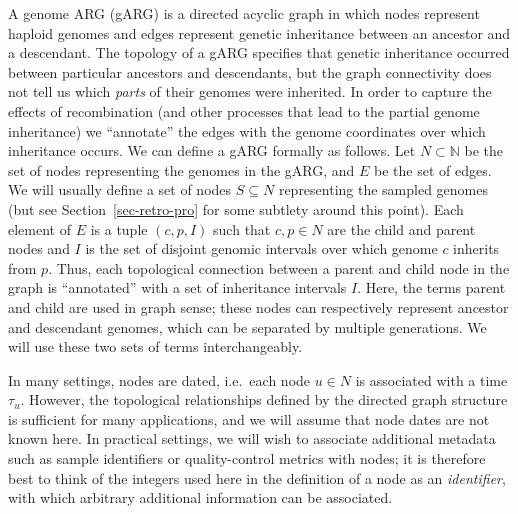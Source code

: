 \documentclass{article}
\begin{document}
A genome ARG (gARG) is a directed acyclic graph in which nodes represent
haploid genomes and edges represent
genetic inheritance between an ancestor and a descendant.
The topology of a gARG specifies that genetic inheritance
occurred between particular
ancestors and descendants, but the graph connectivity
does not tell us which \emph{parts} of their genomes were inherited.
In order to capture the effects of recombination
(and other processes that lead to the partial genome inheritance)
 we ``annotate'' the edges with the genome
coordinates over which inheritance occurs.
We can define a gARG formally as follows.
Let $N \subset \mathbb{N}$ be the set of nodes representing
the genomes in the gARG, and $E$ be the set of edges.
We will usually define a set of nodes $S \subseteq N$
representing the sampled genomes
(but see Section~\ref{sec-retro-pro} for some subtlety around this point).
Each element of $E$ is a tuple $(c, p, I)$ such that $c, p \in N$ are the child and
parent nodes and $I$ is the set of disjoint genomic intervals
over which genome $c$ inherits from $p$.
Thus, each topological connection between
a parent and child node in the graph is ``annotated'' with a set of
inheritance intervals $I$.
Here, the terms parent and child are used in graph sense;
these nodes can respectively represent ancestor and descendant genomes,
which can be separated by multiple generations.
We will use these two sets of terms interchangeably.

In many settings, nodes are dated, i.e.\
each node $u\in N$ is associated with a time $\tau_u$.
However, the topological relationships
defined by the directed graph structure is sufficient for
many applications, and we will assume that node dates are not
known here.
In practical settings, we will wish to associate additional
metadata such as sample identifiers or quality-control metrics
with nodes; it is therefore best to think of the
integers used here in the definition of a node as an \emph{identifier},
with which arbitrary additional information can be associated.
\end{document}
